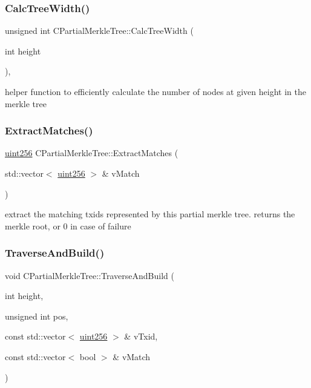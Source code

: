 \subsubsection{\texorpdfstring{CalcTreeWidth()}{CalcTreeWidth()}}
{\footnotesize\ttfamily unsigned int C\+Partial\+Merkle\+Tree\+::\+Calc\+Tree\+Width (\begin{DoxyParamCaption}\item[{int}]{height }\end{DoxyParamCaption})\hspace{0.3cm}{\ttfamily [inline]}, {\ttfamily [protected]}}

helper function to efficiently calculate the number of nodes at given height in the merkle tree \mbox{\label{class_c_partial_merkle_tree_a28c3456d1159b33b6c2689ac88eb56ad}} 
\subsubsection{\texorpdfstring{ExtractMatches()}{ExtractMatches()}}
{\footnotesize\ttfamily \mbox{\hyperlink{classuint256}{uint256}} C\+Partial\+Merkle\+Tree\+::\+Extract\+Matches (\begin{DoxyParamCaption}\item[{std\+::vector$<$ \mbox{\hyperlink{classuint256}{uint256}} $>$ \&}]{v\+Match }\end{DoxyParamCaption})}

extract the matching txid\textquotesingle{}s represented by this partial merkle tree. returns the merkle root, or 0 in case of failure \mbox{\label{class_c_partial_merkle_tree_a62bdcaf5b5ee6c6327ef67fb027a5fef}} 
\subsubsection{\texorpdfstring{TraverseAndBuild()}{TraverseAndBuild()}}
{\footnotesize\ttfamily void C\+Partial\+Merkle\+Tree\+::\+Traverse\+And\+Build (\begin{DoxyParamCaption}\item[{int}]{height,  }\item[{unsigned int}]{pos,  }\item[{const std\+::vector$<$ \mbox{\hyperlink{classuint256}{uint256}} $>$ \&}]{v\+Txid,  }\item[{const std\+::vector$<$ bool $>$ \&}]{v\+Match }\end{DoxyParamCaption})\hspace{0.3cm}{\ttfamily [protected]}}

